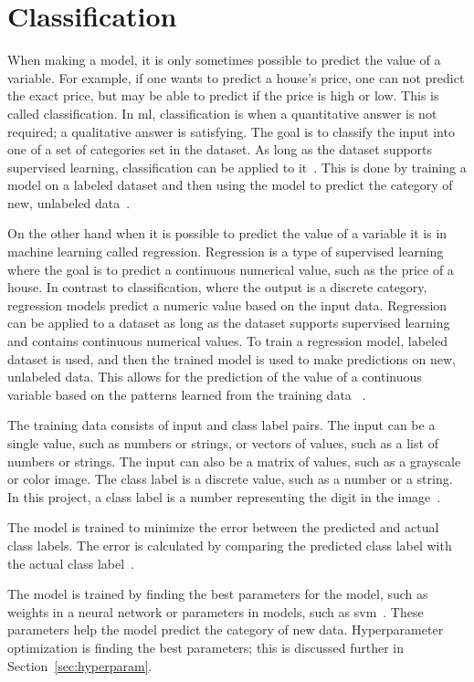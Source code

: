 \section{Classification}\label{sec:classification}
When making a model, it is only sometimes possible to predict the value of a variable. For example, if one wants to predict a house's price, one can not predict the exact price, but may be able to predict if the price is high or low. This is called classification. In \gls{ml}, classification is when a quantitative answer is not required; a qualitative answer is satisfying. The goal is to classify the input into one of a set of categories set in the dataset. As long as the dataset supports supervised learning, classification can be applied to it~\cite{james-statistical-learning1}.
This is done by training a model on a labeled dataset and then using the model to predict the category of new, unlabeled data~\cite{james-statistical-learning1}.

On the other hand when it is possible to predict the value of a variable it is in machine learning called regression. Regression is a type of supervised learning where the goal is to predict a continuous numerical value, such as the price of a house. In contrast to classification, where the output is a discrete category, regression models predict a numeric value based on the input data. Regression can be applied to a dataset as long as the dataset supports supervised learning and contains continuous numerical values. To train a regression model, labeled dataset is used, and then the trained model is used to make predictions on new, unlabeled data. This allows for the prediction of the value of a continuous variable based on the patterns learned from the training data ~\cite{james-statistical-learning1}. 

The training data consists of input and class label pairs. The input can be a single value, such as numbers or strings, or vectors of values, such as a list of numbers or strings. The input can also be a matrix of values, such as a grayscale or color image. The class label is a discrete value, such as a number or a string. In this project, a class label is a number representing the digit in the image~\cite{james-statistical-learning1}.

The model is trained to minimize the error between the predicted and actual class labels. The error is calculated by comparing the predicted class label with the actual class label~\cite{james-statistical-learning1}.

The model is trained by finding the best parameters for the model, such as weights in a neural network or parameters in models, such as \gls{svm}~\cite{james-statistical-learning1}. These parameters help the model predict the category of new data. Hyperparameter optimization is finding the best parameters; this is discussed further in Section~\ref{sec:hyperparam}.

